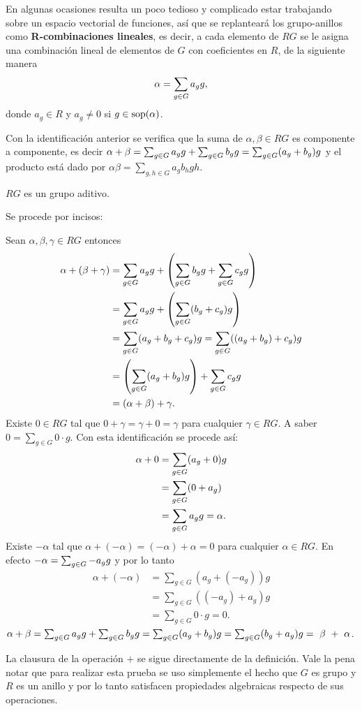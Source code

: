 En algunas ocasiones resulta un poco tedioso y complicado estar trabajando sobre un espacio vectorial de funciones, así que se replanteará los grupo-anillos como \textbf{R-combinaciones lineales}, es decir, a cada elemento de $RG$ se le asigna una combinación lineal de elementos de $G$ con coeficientes en $R$, de la siguiente manera
\begin{equation}
\alpha = \sum_{g \in G} a_{g} g,
\end{equation}
donde $a_g \in R$ y $a_g \neq 0$ si $g \in \operatorname{sop} (\alpha)$.
\begin{nota}
Con la identificación anterior se verifica que la suma de $\alpha, \beta \in RG$ es componente a componente, es decir $\alpha + \beta= \sum_{g \in G} a_{g} g+\sum_{g \in G} b_{g} g= \sum_{g\in G} (a_g+b_g)g $ y el producto está dado por $\alpha\beta=\sum_{g,h\in G}a_gb_hgh$.
\end{nota}
\begin{teorema}\label{grupo}
$RG$ es un grupo aditivo.
\end{teorema}
\begin{proof*}
Se procede por incisos:
\begin{bulletList}
\newItem  Sean $\alpha, \beta, \gamma \in RG$ entonces 
\begin{align*}
\alpha+(\beta+\gamma)&=\sum_{g \in G} a_{g} g+\left(\sum_{g \in G} b_{g} g+ \sum_{g \in G} c_{g} g \right)\\
&=\sum_{g \in G} a_{g} g+\left(\sum_{g\in G}(b_g+c_g)g\right)\\
&=\sum_{g\in G}(a_g+b_g+c_g)g= \sum_{g\in G}((a_g+b_g)+c_g)g\\
&=\left(\sum_{g\in G}(a_g+b_g)g \right) +\sum_{g \in G} c_{g} g\\
&=(\alpha+\beta)+\gamma.  
\end{align*}
\newItem Existe $0 \in RG$ tal que $0+\gamma=\gamma+0=\gamma$ para cualquier $\gamma \in RG$. A saber $0=\sum_{g \in G}0\cdot g$. Con esta identificación se procede así: 
\begin{align*}
\alpha + 0 &= \sum_{g \in G}(a_g+0)g \\
&=\sum_{g\in G}(0+a_g)\\
&=\sum_{g \in G} a_{g} g=\alpha.
\end{align*}
\newItem Existe $-\alpha$ tal que $\alpha+(-\alpha)= (-\alpha)+\alpha =0$ para cualquier $\alpha \in RG$. En efecto $-\alpha = \sum_{g \in G} -a_{g} g$ y por lo tanto
\begin{align*}
\alpha+ (-\alpha)&=\sum_{g\in G}(a_g+(-a_g) )g\\
&= \sum_{g\in G}((-a_g)+a_g)g\\ 
&= \sum_{g \in G}0\cdot g = 0.
\end{align*} 
\newItem $\alpha + \beta = \sum_{g \in G} a_{g} g+\sum_{g \in G} b_{g} g=\sum_{g \in G}(a_g+b_g)g= \sum_{g \in G}(b_g+a_g)g=~\beta ~+~ \alpha $.\qedhere
\end{bulletList}
\end{proof*}
La clausura de la operación $+$  se sigue directamente de la definición. Vale la pena notar que para realizar esta prueba se uso simplemente el hecho que $G$ es grupo y $R$ es un anillo y por lo tanto satisfacen propiedades algebraicas respecto de sus operaciones.


